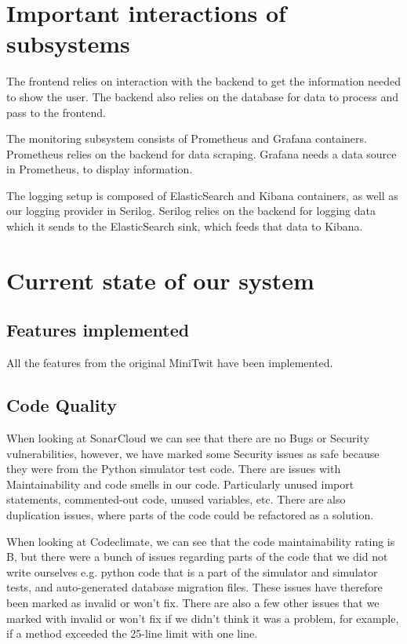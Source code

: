 \section{Important interactions of subsystems}
The frontend relies on interaction with the backend to get the information needed to show the user. The backend also relies on the database for data to process and pass to the frontend.\newline

\noindent The monitoring subsystem consists of Prometheus and Grafana containers. Prometheus relies on the backend for data scraping. Grafana needs a data source in Prometheus, to display information. \newline

\noindent The logging setup is composed of ElasticSearch and Kibana containers, as well as our logging provider in Serilog. Serilog relies on the backend for logging data which it sends to the ElasticSearch sink, which feeds that data to Kibana.



\section{Current state of our system}

\subsection{Features implemented}
All the features from the original MiniTwit have been implemented.

\subsection{Code Quality}
When looking at SonarCloud we can see that there are no Bugs or Security vulnerabilities, however, we have marked some Security issues as safe because they were from the Python simulator test code. There are issues with Maintainability and code smells in our code. Particularly unused import statements, commented-out code, unused variables, etc. There are also duplication issues, where parts of the code could be refactored as a solution. \newline

\noindent When looking at Codeclimate, we can see that the code maintainability rating is B, but there were a bunch of issues regarding parts of the code that we did not write ourselves e.g. python code that is a part of the simulator and simulator tests, and auto-generated database migration files. These issues have therefore been marked as invalid or won't fix. There are also a few other issues that we marked with invalid or won't fix if we didn't think it was a problem, for example, if a method exceeded the 25-line limit with one line.


